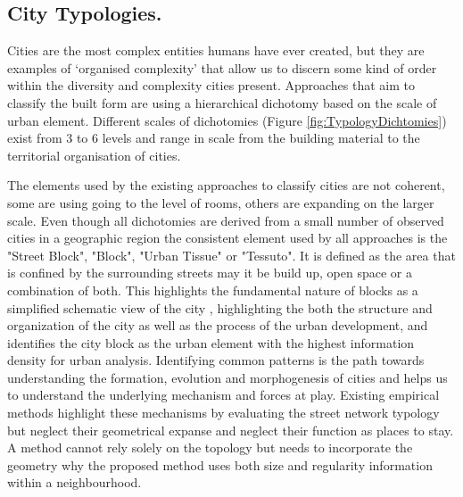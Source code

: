 \documentclass{nature}
\begin{document}




\subsection{City Typologies.}\label{sec:introduction2}
Cities are the most complex entities humans have ever created, but they are examples of `organised complexity' that allow us to discern some kind of order within the diversity and complexity cities present\cite{Kropf2014}. Approaches that aim to classify the built form are using a hierarchical dichotomy based on the scale of urban element. Different scales of dichotomies (Figure \ref{fig:TypologyDichtomies}) exist from 3 to 6 levels and range in scale from the building material to the territorial organisation of cities\cite{Lynch1981,Conzen1960,Caniggi1979,Castex1980,Mouden1988,Allain2004}.


The elements used by the existing approaches to classify cities are not coherent, some are using going to the level of rooms, others are expanding on the larger scale. Even though all dichotomies are derived from a small number of observed cities in a geographic region the consistent element used by all approaches is the "Street Block", "Block", "Urban Tissue" or "Tessuto". It is defined as the area that is confined by the surrounding streets may it be build up, open space or a combination of both. This highlights the fundamental nature of blocks as a simplified schematic view of the city \cite{Southworth2013}, highlighting the both the structure and organization of the city as well as the process of the urban development, and identifies the city block as the urban element with the highest information density for urban analysis.  
Identifying common patterns is the path towards understanding the formation, evolution and morphogenesis of cities and helps us to understand the underlying mechanism and forces at play. Existing empirical methods highlight these mechanisms by evaluating the street network typology \cite{Hillier1989} but neglect their geometrical expanse and neglect their function as places to stay.  A method cannot rely solely on the topology but needs to incorporate the geometry \cite{Louf2014a} why the proposed method uses both size and regularity information within a neighbourhood.
\end{document}

